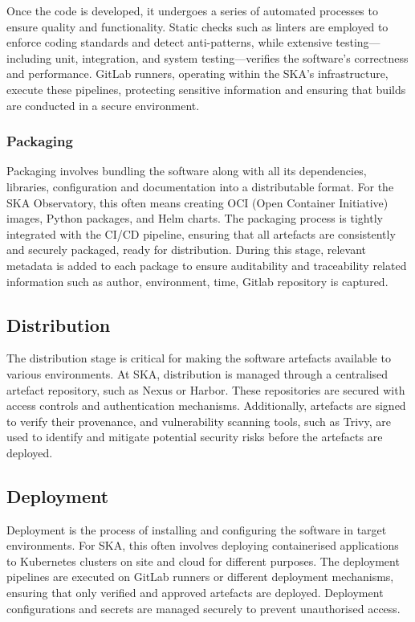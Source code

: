\documentclass[a4paper]{spie}  %
\begin{document}
Once the code is developed, it undergoes a series of automated processes to ensure quality and functionality. Static checks such as linters are employed to enforce coding standards and detect anti-patterns, while extensive testing—including unit, integration, and system testing—verifies the software's correctness and performance. GitLab runners, operating within the SKA's infrastructure, execute these pipelines, protecting sensitive information and ensuring that builds are conducted in a secure environment.

\subsubsection{Packaging}

Packaging involves bundling the software along with all its dependencies, libraries, configuration and documentation into a distributable format. For the SKA Observatory, this often means creating OCI (Open Container Initiative) images, Python packages, and Helm charts. The packaging process is tightly integrated with the CI/CD pipeline, ensuring that all artefacts are consistently and securely packaged, ready for distribution. During this stage, relevant metadata is added to each package to ensure auditability and traceability related information such as  author, environment, time, Gitlab repository is captured.

\subsection{Distribution}

The distribution stage is critical for making the software artefacts available to various environments. At SKA, distribution is managed through a centralised artefact repository, such as Nexus\cite{SonatypeNexusRepository} or Harbor\cite{Harbor}. These repositories are secured with access controls and authentication mechanisms. Additionally, artefacts are signed to verify their provenance, and vulnerability scanning tools, such as Trivy\cite{TrivyHome}, are used to identify and mitigate potential security risks before the artefacts are deployed.

\subsection{Deployment}

Deployment is the process of installing and configuring the software in target environments. For SKA, this often involves deploying containerised applications to Kubernetes clusters on site and cloud for different purposes. The deployment pipelines are executed on GitLab runners or different deployment mechanisms, ensuring that only verified and approved artefacts are deployed. Deployment configurations and secrets are managed securely to prevent unauthorised access.
\end{document}
